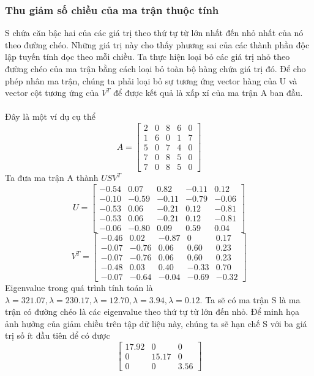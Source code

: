 \subsubsection{Thu giảm số chiều của ma trận thuộc tính}
S chứa căn bậc hai của các giá trị theo thứ tự từ lớn nhất đến nhỏ nhất của nó
theo đường chéo. Những giá trị này cho thấy phương sai của các thành phần độc
lập tuyến tính dọc theo mỗi chiều. Ta thực hiện loại bỏ các giá trị nhỏ theo
đường chéo của ma trận bằng cách loại bỏ toàn bộ hàng chứa giá trị đó. Để cho
phép nhân ma trận, chúng ta phải loại bỏ sự tương ứng vector hàng của U và
vector cột tương ứng của $V^T$ để được kết quả là xấp xỉ của ma trận A ban đầu.\\\\
Đây là một ví dụ cụ thể
\[ A =
\begin{bmatrix}
2 & 0 & 8 & 6 & 0 \\
1 & 6 & 0 & 1 & 7 \\
5 & 0 & 7 & 4 & 0 \\
7 & 0 & 8 & 5 & 0 \\
7 & 0 & 8 & 5 & 0
\end{bmatrix} \]
Ta đưa ma trận A thành $USV^T$
\[ U =
\begin{bmatrix}
-0.54 & 0.07 & 0.82 & -0.11 & 0.12 \\
-0.10 & -0.59 & -0.11 & -0.79 & -0.06 \\
-0.53 & 0.06 & -0.21 & 0.12 & -0.81 \\
-0.53 & 0.06 & -0.21 & 0.12 & -0.81 \\
-0.06 & -0.80 & 0.09 & 0.59 & 0.04
\end{bmatrix} \]
\[ V^T =
\begin{bmatrix}
-0.46 & 0.02 & -0.87 & 0 & 0.17 \\
-0.07 & -0.76 & 0.06 & 0.60 & 0.23 \\
-0.07 & -0.76 & 0.06 & 0.60 & 0.23 \\
-0.48 & 0.03 & 0.40 & -0.33 & 0.70 \\
-0.07 & -0.64 & -0.04 & -0.69 & -0.32
\end{bmatrix} \]
Eigenvalue trong quá trình tính toán là $\lambda = 321.07, \lambda = 230.17, \lambda =
12.70, \lambda = 3.94, \lambda = 0.12$.
Ta sẽ có ma trận S là ma trận có đường chéo là các eigenvalue theo thứ tự từ lớn
đến nhỏ. Để minh họa ảnh hưởng của giảm chiều trên tập dữ liệu này, chúng ta sẽ hạn chế S với ba giá trị số ít đầu tiên để có được
\[\begin{bmatrix}
17.92 & 0 & 0 \\
0 & 15.17 & 0 \\
0 & 0 & 3.56 
\end{bmatrix} \]
